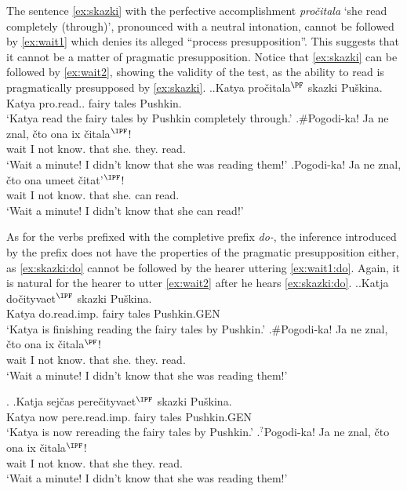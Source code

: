The sentence \ref{ex:skazki} with the perfective accomplishment \textit{pro\v{c}itala} `she read completely (through)', pronounced with a neutral intonation, cannot be followed by \ref{ex:wait1} which denies its alleged ``process presupposition''. This suggests that it cannot be a matter of pragmatic presupposition. Notice that \ref{ex:skazki} can be followed by \ref{ex:wait2}, showing the validity of the test, as the ability to read is pragmatically presupposed by \ref{ex:skazki}.
\ex.\ag.\label{ex:skazki}Katya pro\v{c}itala$^{\PF}$ skazki Pu\v{s}kina.\\
Katya pro.read.. {fairy tales} Pushkin.\\
\trans `Katya read the fairy tales by Pushkin completely through.'
\bg.\#Pogodi-ka! Ja ne znal, \v{c}to ona ix \v{c}itala$^{\IPF}$!\label{ex:wait1}\\
wait I not know. that she. they. read.\\
\trans `Wait a minute! I didn't know that she was reading them!'
\bg.\label{ex:wait2}Pogodi-ka! Ja ne znal, \v{c}to ona umeet \v{c}itat'$^{\IPF}$!\\
wait I not know. that she. can read.\\
\trans `Wait a minute! I didn't know that she can read!'


As for the verbs prefixed with the completive prefix \textit{do-}, the inference introduced by the prefix does not have the properties of the pragmatic presupposition either, as \ref{ex:skazki:do} cannot be followed by the hearer uttering \ref{ex:wait1:do}. Again, it is natural for the hearer to utter \ref{ex:wait2} after he hears \ref{ex:skazki:do}.
\ex.\ag.\label{ex:skazki:do}Katja do\v{c}ityvaet$^{\IPF}$ skazki Pu\v{s}kina.\\
Katya do.read.imp. {fairy tales} Pushkin.{\tiny GEN}\\
\trans `Katya is finishing reading the fairy tales by Pushkin.'
\bg.\#Pogodi-ka! Ja ne znal, \v{c}to ona ix \v{c}itala$^{\PF}$!\label{ex:wait1:do}\\
wait I not know. that she. they. read.\\
\trans `Wait a minute! I didn't know that she was reading them!'

\ex. \label{ex:skazki:pere}\ag.\label{ex:skazki:pere1}Katja sej\v{c}as pere\v{c}ityvaet$^{\IPF}$ skazki Pu\v{s}kina.\\
Katya now pere.read.imp. {fairy tales} Pushkin.{\tiny GEN}\\
\trans `Katya is now rereading the fairy tales by Pushkin.'
\bg.$^?$Pogodi-ka! Ja ne znal, \v{c}to ona ix \v{c}itala$^{\IPF}$!\label{ex:wait1:pere}\\
wait I not know. that she they. read.\\
\trans `Wait a minute! I didn't know that she was reading them!'

